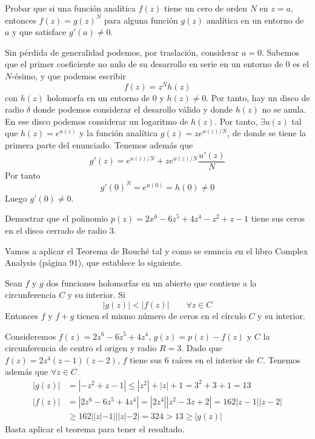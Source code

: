 \documentclass[twoside]{article}
\begin{document}
\begin{ejercicio}{4}
Probar que si una función analítica $f(z)$ tiene un cero de orden $N$ en $z=a$, entonces $f(z)=g(z)^N$ para alguna función $g(z)$ analítica en un entorno de $a$ y que satisface $g'(a)\neq 0$.
\end{ejercicio}
\begin{solucion}
Sin pérdida de generalidad podemos, por traslación, considerar $a=0$. Sabemos que el primer coeficiente no nulo de su desarrollo en serie en un entorno de $0$ es el $N$-ésimo, y que podemos escribir
$$
f(z) = z^Nh(z)
$$
con $h(z)$ holomorfa en un entorno de $0$ y $h(z)\neq 0$. Por tanto, hay un disco de radio $\delta$ donde podemos considerar el desarollo válido y donde $h(z)$ no se anula. En ese disco podemos considerar un logaritmo de $h(z)$. Por tanto, $\exists u(z)$ tal que $h(z)=e^{u(z)}$ y la función analítica $g(z)=ze^{u(z)/N}$, de donde se tiene la primera parte del enunciado. Tenemos además que
$$
g'(z)=e^{u(z)/N}+ze^{u(z)/N}\frac{u'(z)}{N}
$$
Por tanto
$$
g'(0)^N = e^{u(0)} = h(0) \neq 0
$$
Luego $g'(0)\neq 0$.
\end{solucion}
\newpage

\begin{ejercicio}{5}
Demostrar que el polinomio $p(z)=2x^6-6z^5+4z^4-z^2+z-1$ tiene sus ceros en el disco cerrado de radio $3$.
\begin{solucion}
Vamos a aplicar el Teorema de Rouché tal y como se enuncia en el libro Complex Analysis (página 91), que establece lo siguiente.
\begin{theorem}
Sean $f$ y $g$ dos funciones holomorfas en un abierto que contiene a la circunferencia $C$ y su interior. Si 
$$|g(z)|<|f(z)| \qquad \forall z \in C
$$
Entonces $f$ y $f+g$ tienen el mismo número de ceros en el  círculo $C$ y su interior. 
\end{theorem}
Consideremos $f(z)=2z^6-6z^5+4z^4$, $g(z)=p(z)-f(z)$ y $C$ la circunferencia de centro el origen y radio $R=3$. Dado que $f(z)=2z^4(z-1)(z-2)$, $f$ tiene sus 6 raíces en el interior de $C$. Tenemos además que $\forall z \in C$ 
\begin{align*}
|g(z)|&=|-z^2+z-1|\leq |z^2|+|z|+1 = 3^2+3+1=13\\
|f(z)|&=|2z^6-6z^5+4z^4|=|2z^4||z^2-3z+2|=162|z-1||z-2|\\
&\geq 162||z|-1|||z|-2| = 324 > 13 \geq |g(z)|
\end{align*}
Basta aplicar el teorema para tener el resultado.
\end{solucion}
\end{ejercicio}
\end{document}
